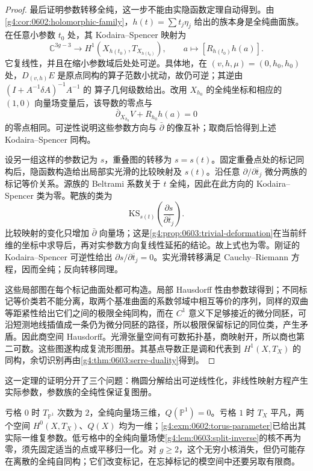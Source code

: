 \begin{proof}
	最后证明参数转移全纯，这一步不能由实隐函数定理自动得到。由\cref{g4:cor:0602:holomorphic-family}，\(h(t)=\sum t_j\eta_j\) 给出的族本身是全纯曲面族。在任意小参数 \(t_0\) 处，其 Kodaira--Spencer 映射为
	\[
		\mathbb C^{3g-3}\longrightarrow H^1(X_{h(t_0)},T_{X_{h(t_0)}}),
		\qquad a\longmapsto[R_{h(t_0)}h(a)].
	\]
	它复线性，并且在缩小参数域后处处可逆。具体地，在 \((v,h,\mu)=(0,h_0,h_0)\) 处，\(D_{(v,h)}E\) 是原点同构的算子范数小扰动，故仍可逆；其逆由 \((I+A^{-1}\delta A)^{-1}A^{-1}\) 的 算子几何级数给出。改用 \(X_{h_0}\) 的全纯坐标和相应的 \((1,0)\) 向量场变量后，该导数的零点与
	\[
		\bar\partial_{X_{h_0}}V+R_{h_0}h(a)=0
	\]
	的零点相同。可逆性说明这些参数方向与 \(\bar\partial\) 的像互补；取商后恰得到上述 Kodaira--Spencer 同构。

	设另一组这样的参数记为 \(s\)，重叠图的转移为 \(s=s(t)\)。固定重叠点处的标记同构后，隐函数构造给出局部实光滑的比较映射及 \(s(t)\)。沿任意 \(\partial/\partial\overline t_j\) 微分两族的标记等价关系。源族的 Beltrami 系数关于 \(t\) 全纯，因此在此方向的 Kodaira--Spencer 类为零。靶族的类为
	\[
		\mathrm{KS}_{s(t)}\left(\frac{\partial s}{\partial\overline t_j}\right).
	\]
	比较映射的变化只增加 \(\bar\partial\) 向量场；这是\cref{g4:prop:0603:trivial-deformation}在当前纤维的坐标中求导后，再对实参数方向复线性延拓的结论。故上式也为零。刚证的 Kodaira--Spencer 可逆性给出 \(\partial s/\partial\overline t_j=0\)。实光滑转移满足 Cauchy--Riemann 方程，因而全纯；反向转移同理。

	这些局部图在每个标记曲面处都可构造。局部 Hausdorff 性由参数球得到；不同标记等价类若不能分离，取两个基准曲面的系数邻域中相互等价的序列，同样的双曲等距紧性给出它们之间的极限全纯同构，而在 \(C^1\) 意义下足够接近的微分同胚，可沿短测地线插值成一条仍为微分同胚的路径，所以极限保留标记的同位类，产生矛盾。因此商空间 Hausdorff。光滑张量空间有可数拓扑基，商映射开，所以商也第二可数。这些图遂构成复流形图册。其基点导数正是调和代表到 \(H^1(X,T_X)\) 的同构，余切识别再由\cref{g4:thm:0603:serre-duality}得到。
\end{proof}

这一定理的证明分开了三个问题：椭圆分解给出可逆线性化，非线性映射方程产生实际参数，参数族的全纯性保证复图册。

\begin{example}\label{g4:exm:0603:low-genus}
	亏格 \(0\) 时 \(T_{\mathbb P^1}\) 次数为 \(2\)，全纯向量场三维，\(Q(\mathbb P^1)=0\)。亏格 \(1\) 时 \(T_X\) 平凡，两个空间 \(H^0(X,T_X)\)、\(Q(X)\) 均为一维；\cref{g4:exm:0602:torus-parameter}已给出其实际一维复参数。低亏格中的全纯向量场使\cref{g4:lem:0603:split-inverse}的核不再为零，须先固定适当的点或平移归一化。对 \(g\ge2\)，这个无穷小核消失，但仍可能存在离散的全纯自同构；它们改变标记，在忘掉标记的模空间中还要另取有限商。
\end{example}
